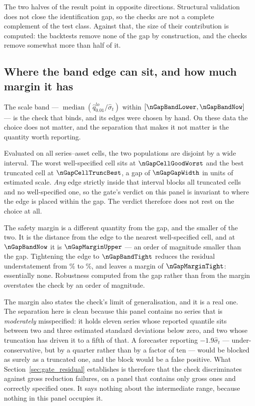 The two halves of the result point in opposite directions. Structural validation
does not close the identification gap, so the checks are not a complete
complement of the test class. Against that, the size of their contribution is
computed: the backtests remove none of the gap by construction, and the checks
remove somewhat more than half of it.

\subsection{\texorpdfstring{Where the band edge can sit, and how much margin it has}{Where the band edge can sit, and how much margin it has}}
\label{sec:gate_band}

The scale band --- $\operatorname{median}(\hat q^{lo}_{0.01}/\hat\sigma_t)$
within $[\nGapBandLower, \nGapBandNow]$ --- is the check that binds, and its
edges were chosen by hand. On these data the choice does not matter, and the
separation that makes it not matter is the quantity worth reporting.

Evaluated on all \nGapCellsTotal{} series--asset cells, the two populations are
disjoint by a wide interval. The worst well-specified cell sits at
$\nGapCellGoodWorst$ and the best truncated cell at $\nGapCellTruncBest$, a gap
of $\nGapGapWidth$ in units of estimated scale. \emph{Any} edge strictly inside
that interval blocks all \nGapCellsTrunc{} truncated cells and no well-specified
one, so the gate's verdict on this panel is invariant to where the edge is placed
within the gap. The verdict therefore does not rest on the choice at all.

The safety margin is a different quantity from the gap, and the smaller of the
two. It is the distance from the edge to the nearest well-specified cell, and at
$\nGapBandNow$ it is $\nGapMarginUpper$ --- an order of magnitude smaller than
the gap. Tightening the edge to $\nGapBandTight$ reduces the residual
understatement from \nGapUndGateNow\% to \nGapUndTight\%, and leaves a margin of
$\nGapMarginTight$: essentially none. Robustness computed from the gap rather
than from the margin overstates the check by an order of magnitude.

The margin also states the check's limit of generalisation, and it is a real one.
The separation here is clean because this panel contains no series that is
\emph{moderately} misspecified: it holds eleven series whose reported quantile
sits between two and three estimated standard deviations below zero, and two
whose truncation has driven it to a fifth of that. A forecaster reporting
$-1.9\hat\sigma_t$ --- under-conservative, but by a quarter rather than by a
factor of ten --- would be blocked as surely as a truncated one, and the block
would be a false positive. What Section~\ref{sec:gate_residual} establishes is
therefore that the check discriminates against gross reduction failures, on a
panel that contains only gross ones and correctly specified ones. It says nothing
about the intermediate range, because nothing in this panel occupies it.


